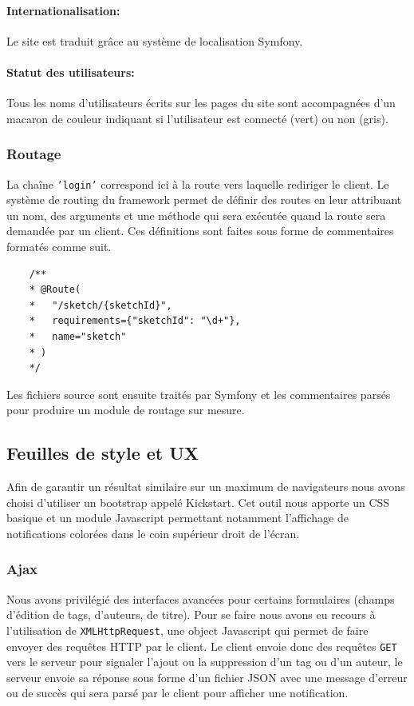 \documentclass[a4paper]{article}
\begin{document}
\paragraph{Internationalisation: }Le site est traduit grâce au système de localisation Symfony.
\paragraph{Statut des utilisateurs: }Tous les noms d'utilisateurs écrits sur les pages du site sont accompagnées d'un macaron de couleur indiquant si l'utilisateur est connecté (vert) ou non (gris).


\subsubsection{Routage}
La chaîne \texttt{'login'} correspond ici à la route vers laquelle rediriger le client. Le système de routing du framework permet de définir des routes en leur attribuant un nom, des arguments et une méthode qui sera exécutée quand la route sera demandée par un client. Ces définitions sont faites sous forme de commentaires formatés comme suit.
\begin{lstlisting}
	/**
	* @Route(
	*   "/sketch/{sketchId}",
	*   requirements={"sketchId": "\d+"},
	*   name="sketch"
	* )
	*/
\end{lstlisting}
Les fichiers source sont ensuite traités par Symfony et les commentaires parsés pour produire un module de routage sur mesure.

\subsection{Feuilles de style et UX}
Afin de garantir un résultat similaire sur un maximum de navigateurs nous avons choisi d'utiliser un bootstrap appelé Kickstart. Cet outil nous apporte un CSS basique et un module Javascript permettant notamment l'affichage de notifications colorées dans le coin supérieur droit de l'écran.

\subsubsection{Ajax}
Nous avons privilégié des interfaces avancées pour certains formulaires (champs d'édition de tags, d'auteurs, de titre). Pour se faire nous avons eu recours à l'utilisation de \texttt{XMLHttpRequest}, une object Javascript qui permet de faire envoyer des requêtes HTTP par le client. Le client envoie donc des requêtes \texttt{GET} vers le serveur pour signaler l'ajout ou la suppression d'un tag ou d'un auteur, le serveur envoie sa réponse sous forme d'un fichier JSON avec une message d'erreur ou de succès qui sera parsé par le client pour afficher une notification.
\end{document}
